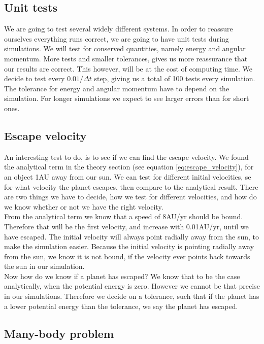 \documentclass[reprint, english,notitlepage,nofootinbib]{revtex4-1}  %
\begin{document}
\subsection{Unit tests}
We are going to test several widely different systems. In order to reassure ourselves everything runs correct, we are going to have unit tests during simulations. We will test for conserved quantities, namely energy and angular momentum. More tests and smaller tolerances, gives us more reassurance that our results are correct. This however, will be at the cost of computing time. We decide to test every $0.01/\Delta t$ step, giving us a total of 100 tests every simulation. The tolerance for energy and angular momentum have to depend on the simulation. For longer simulations we expect to see larger errors than for short ones.

\subsection{Escape velocity}
An interesting test to do, is to see if we can find the escape velocity. We found the analytical term in the theory section (see equation \eqref{eq:escape_velocity}), for an object 1AU away from our sun. We can test for different initial velocities, se for what velocity the planet escapes, then compare to the analytical result. There are two things we have to decide, how we test for different velocities, and how do we know whether or not we have the right velocity.
\\
From the analytical term we know that a speed of 8AU/yr should be bound. Therefore that will be the first velocity, and increase with 0.01AU/yr, until we have escaped. The initial velocity will always point radially away from the sun, to make the simulation easier. Because the initial velocity is pointing radially away from the sun, we know it is not bound, if the velocity ever points back towards the sun in our simulation.
\\
Now how do we know if a planet has escaped? We know that to be the case analytically, when the potential energy is zero. However we cannot be that precise in our simulations. Therefore we decide on a tolerance, such that if the planet has a lower potential energy than the tolerance, we say the planet has escaped.

\subsection{Many-body problem}
\end{document}
